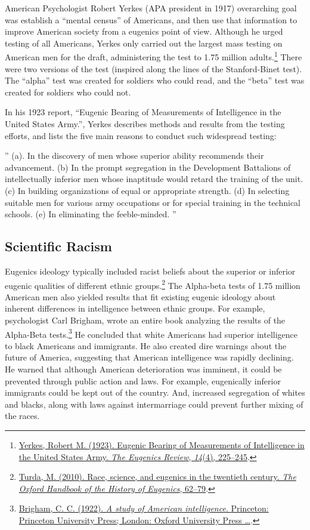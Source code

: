 \documentclass[
  oneside,
  12pt]{crumpbook}
\begin{document}
American Psychologist Robert Yerkes (APA president in 1917) overarching goal was establish a ``mental census'' of Americans, and then use that information to improve American society from a eugenics point of view. Although he urged testing of all Americans, Yerkes only carried out the largest mass testing on American men for the draft, administering the test to 1.75 million adults.\footnote{\protect\hyperlink{ref-yerkesEugenicBearingMeasurements1923}{Yerkes, Robert M. (1923). Eugenic {Bearing} of {Measurements} of {Intelligence} in the {United States Army}. \emph{The Eugenics Review}, \emph{14}(4), 225--245}.} There were two versions of the test (inspired along the lines of the Stanford-Binet test). The ``alpha'' test was created for soldiers who could read, and the ``beta'' test was created for soldiers who could not.

In his 1923 report, ``Eugenic Bearing of Measurements of Intelligence in the United States Army.'', Yerkes describes methods and results from the testing efforts, and lists the five main reasons to conduct such widespread testing:

''
(a). In the discovery of men whose superior ability recommends their advancement.
(b) In the prompt segregation in the Development Battalions of intellectually inferior men whose inaptitude would retard the training of the unit.
(c) In building organizations of equal or appropriate strength.
(d) In selecting suitable men for various army occupations or for special
training in the technical schools.
(e) In eliminating the feeble-minded.
''

\hypertarget{scientific-racism}{%
\subsection{Scientific Racism}\label{scientific-racism}}

Eugenics ideology typically included racist beliefs about the superior or inferior eugenic qualities of different ethnic groups.\footnote{\protect\hyperlink{ref-turdaRaceScienceEugenics2010}{Turda, M. (2010). Race, science, and eugenics in the twentieth century. \emph{The Oxford Handbook of the History of Eugenics}, 62--79}.} The Alpha-beta tests of 1.75 million American men also yielded results that fit existing eugenic ideology about inherent differences in intelligence between ethnic groups. For example, psychologist Carl Brigham, wrote an entire book analyzing the results of the Alpha-Beta tests.\footnote{\protect\hyperlink{ref-brighamStudyAmericanIntelligence1922}{Brigham, C. C. (1922). \emph{A study of {American} intelligence}. {Princeton: Princeton University Press; London: Oxford University Press \ldots{}}}.} He concluded that white Americans had superior intelligence to black Americans and immigrants. He also created dire warnings about the future of America, suggesting that American intelligence was rapidly declining. He warned that although American deterioration was imminent, it could be prevented through public action and laws. For example, eugenically inferior immigrants could be kept out of the country. And, increased segregation of whites and blacks, along with laws against intermarriage could prevent further mixing of the races.
\end{document}
